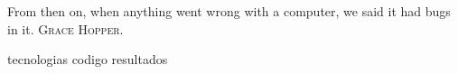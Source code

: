 %
%
%

{
  \epigrafe
  {%
    From then on, when anything went wrong with a computer, we said it had bugs
    in it.%
  }
  {%
     \textsc{Grace Hopper}.%
  }
}

\noindent

{tecnologias}
{codigo}
{resultados}
